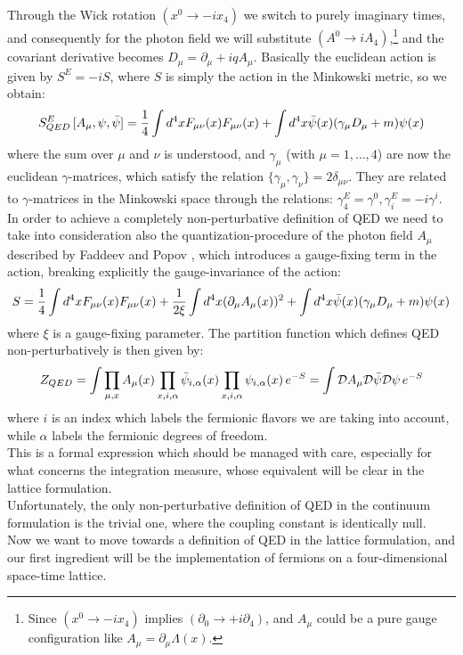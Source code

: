 \\ Through the Wick rotation $(x^0 \to - ix_4)$ we switch to purely imaginary times, and consequently for the photon field we will substitute $(A^0 \to iA_4)$,\footnote{Since $(x^0 \to - ix_4)$ implies $(\partial_0 \to +i\partial_4)$, and $A_\mu$ could be a pure gauge configuration like $A_\mu = \partial_\mu \Lambda(x)$.} and the covariant derivative becomes $D_\mu = \partial_\mu + iqA_\mu$. Basically the euclidean action is given by $S^{E} = - i S$, where $S$ is simply the action in the Minkowski metric, so we obtain:
\begin{equation}
    S_{QED}^E \, [A_\mu, \psi, \Bar{\psi}]= \frac{1}{4} \int d^4 x F_{\mu\nu}(x) F_{\mu\nu}(x) + \int d^4x \Bar{\psi}(x) (\gamma_\mu D_\mu + m) \psi(x)
\end{equation}
where the sum over $\mu$ and $\nu$ is understood, and $\gamma_\mu$ (with $\mu = 1, \dots, 4$) are now the euclidean $\gamma$-matrices, which satisfy the relation $\{\gamma_\mu, \gamma_\nu\} = 2\delta_{\mu\nu}$. They are related to $\gamma$-matrices in the Minkowski space through the relations: $\gamma_4^E = \gamma^0, \gamma_i^E = -i\gamma^i$. 
\\ In order to achieve a completely non-perturbative definition of QED we need to take into consideration also the quantization-procedure of the photon field $A_\mu$ described by Faddeev and Popov \cite{FADDEEV196729}, which introduces a gauge-fixing term in the action, breaking explicitly the gauge-invariance of the action:
\begin{equation}\label{sqed}
    S = \frac{1}{4} \int d^4 x F_{\mu\nu}(x) F_{\mu\nu}(x) + \frac{1}{2\xi} \int d^4x (\partial_\mu A_\mu(x))^2 + \int d^4x \Bar{\psi}(x) (\gamma_\mu D_\mu + m) \psi(x)
\end{equation}
where $\xi$ is a gauge-fixing parameter. The partition function which defines QED non-perturbatively is then given by:
\begin{equation} 
    Z_{QED} = \int \prod_{\mu, x} A_\mu(x) \prod_{x, i, \alpha} \Bar{\psi}_{i,\alpha}(x) \prod_{x, i, \alpha} \psi_{i, \alpha}(x) \, e^{-S} = \int \mathcal{D}A_\mu \mathcal{D}\Bar{\psi} \mathcal{D}\psi \, e^{-S}
\end{equation}
where $i$ is an index which labels the fermionic flavors we are taking into account, while $\alpha$ labels the fermionic degrees of freedom.
\\ This is a formal expression which should be managed with care, especially for what concerns the integration measure, whose equivalent will be clear in the lattice formulation.
\\ Unfortunately, the only non-perturbative definition of QED in the continuum formulation is the trivial one, where the coupling constant is identically null.
\\ Now we want to move towards a definition of QED in the lattice formulation, and our first ingredient will be the implementation of fermions on a four-dimensional space-time lattice. 

